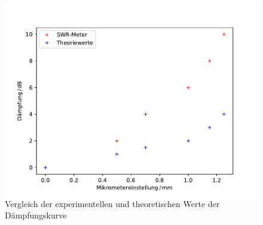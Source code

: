 \begin{figure}
  \centering
  \includegraphics[width = 12 cm]{dämpfung.pdf}
  \caption{Vergleich der experimentellen und theoretischen Werte der Dämpfungskurve}
  \label{fig:dämpfung}
\end{figure}

\newpage
